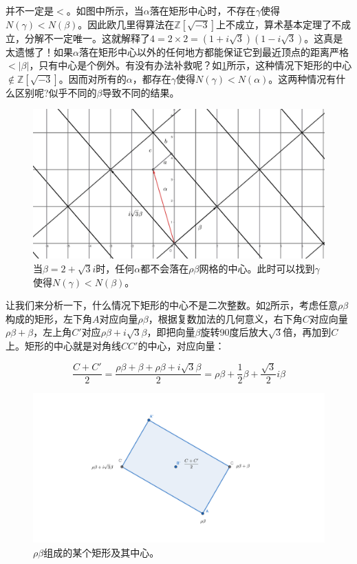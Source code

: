\documentclass[b5paper]{ctexart}
\begin{document}
并不一定是$<$。如图中所示，当$\alpha$落在矩形中心时，不存在$\gamma$使得$N(\gamma) < N(\beta)$。因此欧几里得算法在$\mathbb{Z}[\sqrt{-3}]$上不成立，算术基本定理了不成立，分解不一定唯一。这就解释了$4 = 2 \times 2 = (1 + i\sqrt{3})(1 - i\sqrt{3})$。这真是太遗憾了！如果$\alpha$落在矩形中心以外的任何地方都能保证它到最近顶点的距离严格$< |\beta|$，只有中心是个例外。有没有办法补救呢？如\cref{fig:Z-omega}所示，这种情况下矩形的中心$\notin \mathbb{Z}[\sqrt{-3}]$。因而对所有的$\alpha$，都存在$\gamma$使得$N(\gamma) < N(\alpha)$。这两种情况有什么区别呢?似乎不同的$\beta$导致不同的结果。

\begin{figure}[htbp]
 \centering
 \includegraphics[scale=0.3]{img/z-omega}
 \caption{当$\beta = 2 + \sqrt{3}i$时，任何$\alpha$都不会落在$\rho \beta$网格的中心。此时可以找到$\gamma$使得$N(\gamma) < N(\beta)$。}
 \label{fig:Z-omega}
\end{figure}

让我们来分析一下，什么情况下矩形的中心不是二次整数。如\cref{fig:Z-sqrt-3c}所示，考虑任意$\rho \beta$构成的矩形，左下角$A$对应向量$\rho \beta$，根据复数加法的几何意义，右下角$C$对应向量$\rho \beta + \beta$，左上角$C'$对应$\rho \beta + i\sqrt{3}\beta$，即把向量$\beta$旋转90度后放大$\sqrt{3}$倍，再加到$C$上。矩形的中心就是对角线$CC'$的中心，对应向量：

\[
\frac{C + C'}{2} = \frac{\rho \beta + \beta + \rho \beta + i\sqrt{3}\beta}{2} = \rho \beta + \frac{1}{2}\beta + \frac{\sqrt{3}}{2}i\beta
\]

\begin{figure}[htbp]
 \centering
 \includegraphics[scale=0.3]{img/z-sqrt-3c}
 \caption{$\rho \beta$组成的某个矩形及其中心。}
 \label{fig:Z-sqrt-3c}
\end{figure}
\end{document}
